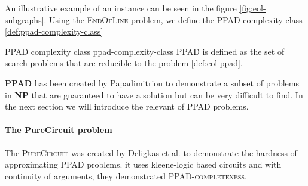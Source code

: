 \vspace{0.2cm}

An illustrative example of an instance can be seen in the figure \ref{fig:eol-subgraphs}. 
Using the \textsc{EndOfLine} problem, we define the
\textsc{PPAD} complexity class \ref{def:ppad-complexity-class}


\begin{definitionbox}{\textsc{PPAD} complexity class \cite{papadimitriou_ComplexityParityArgument_1994}}{ppad-complexity-class}
    \textsc{PPAD} is defined as the set of search problems that
    are reducible to the  problem \ref{def:eol-ppad}.
\end{definitionbox}

\textbf{PPAD} has been created by Papadimitriou \cite{papadimitriou_ComplexityParityArgument_1994}
to demonstrate a subset of problems in \textbf{NP} that are guaranteed to have
a solution but can be very difficult to find. In the next section
we will introduce the relevant of \textsc{PPAD} problems.

\paragraph{The PureCircuit problem}
\label{par:pure-circ-def}

The  \textsc{PureCircuit} was created by Deligkas et al. \cite{deligkas_PureCircuitTightInapproximability_2024}
to demonstrate the hardness of approximating \textsc{PPAD} problems.
it uses kleene-logic based circuits and with continuity of arguments, they demonstrated \textsc{PPAD-completeness}.


